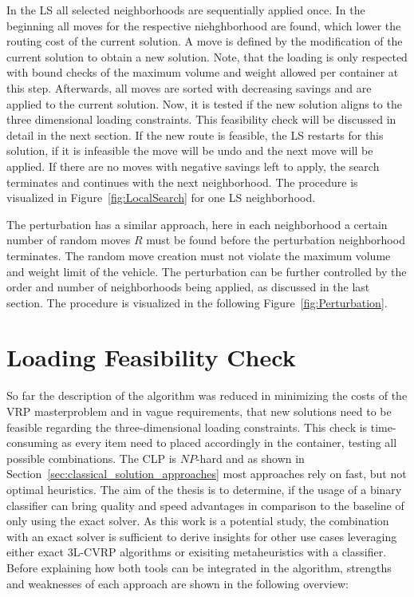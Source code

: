 In the \gls{LS} all selected neighborhoods are sequentially applied once. In the beginning all moves for the respective niehghborhood
are found, which lower the routing cost of the current solution. A move is defined by the modification of the current solution to
obtain a new solution. Note, that the loading is only respected with bound checks of the maximum volume and weight
allowed per container at this step. Afterwards, all moves are sorted with decreasing savings and are applied to the current solution. Now, it is tested
if the new solution aligns to the three dimensional loading constraints. This feasibility check will be discussed in
detail in the next section. If the new route is feasible, the \gls{LS} restarts for this solution, if it is infeasible
the move will be undo and the next move will be applied. If there are no moves with negative savings left to apply, the search
terminates and continues with the next neighborhood. The procedure is visualized in Figure~\ref{fig:LocalSearch} for one \gls{LS} neighborhood.


The perturbation has a similar approach, here in each neighborhood a certain number of random moves $R$ must be found
before the perturbation neighborhood terminates. The random move creation must not violate the maximum volume and weight limit of the vehicle.
The perturbation can be further controlled by the order and number of neighborhoods being applied, as discussed in the last section.
The procedure is visualized in the following Figure~\ref{fig:Perturbation}.



\section{Loading Feasibility Check}
\label{sec:FeasibilityCheck}
So far the description of the algorithm was reduced in minimizing the costs of the \gls{VRP} masterproblem and in vague
requirements, that new solutions need to be feasible regarding the three-dimensional loading constraints.
This check is time-consuming as every item need to placed accordingly in the container, testing all possible combinations.
The \gls{CLP} is $NP$-hard and as shown in Section~\ref{sec:classical_solution_approaches} most approaches rely on fast, but not
optimal heuristics. The aim of the thesis is to determine, if the usage of a binary classifier can bring quality and
speed advantages in comparison to the baseline of only using the exact solver.
As this work is a potential study, the combination with an exact solver is sufficient to derive insights for other use cases
leveraging either exact \gls{3L-CVRP} algorithms or exisiting metaheuristics with a classifier.
Before explaining how both tools can be integrated in the algorithm, strengths and weaknesses of
each approach are shown in the following overview:


